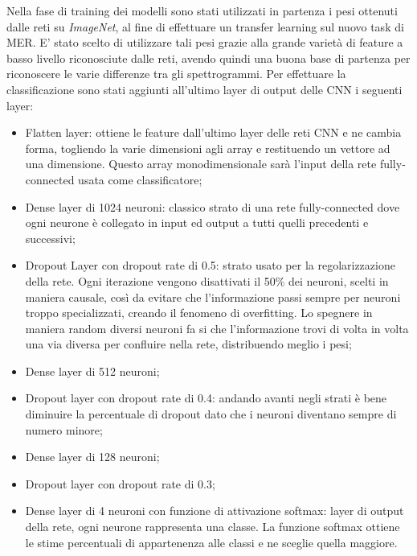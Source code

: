 \documentclass[11pt]{report}
\begin{document}
Nella fase di training dei modelli sono stati utilizzati in partenza i pesi ottenuti dalle reti su \textit{ImageNet}, al fine di effettuare un transfer learning sul nuovo task di MER. E' stato scelto di utilizzare tali pesi grazie alla grande varietà di feature a basso livello riconosciute dalle reti, avendo quindi una buona base di partenza per riconoscere le varie differenze tra gli spettrogrammi. Per effettuare la classificazione sono stati aggiunti all'ultimo layer di output delle CNN i seguenti layer:
\begin{itemize}
    \item Flatten layer: ottiene le feature dall'ultimo layer delle reti CNN e ne cambia forma, togliendo la varie dimensioni agli array e restituendo un vettore ad una dimensione. Questo array monodimensionale sarà l'input della rete fully-connected usata come classificatore;
    
    \item Dense layer di 1024 neuroni: classico strato di una rete fully-connected dove ogni neurone è collegato in input ed output a tutti quelli precedenti e successivi;
    
    \item Dropout Layer con dropout rate di 0.5: strato usato per la regolarizzazione della rete. Ogni iterazione vengono disattivati il 50\% dei neuroni, scelti in maniera causale, così da evitare che l'informazione passi sempre per neuroni troppo specializzati, creando il fenomeno di overfitting. Lo spegnere in maniera random diversi neuroni fa si che l'informazione trovi di volta in volta una via diversa per confluire nella rete, distribuendo meglio i pesi;

    \item Dense layer di 512 neuroni;
    
    \item Dropout layer con dropout rate di 0.4: andando avanti negli strati è bene diminuire la percentuale di dropout dato che i neuroni diventano sempre di numero minore;
    
    \item Dense layer di 128 neuroni;
    
    \item Dropout layer con dropout rate di 0.3;
    
    \item Dense layer di 4 neuroni con funzione di attivazione softmax: layer di output della rete, ogni neurone rappresenta una classe. La funzione softmax ottiene le stime percentuali di appartenenza alle classi e ne sceglie quella maggiore.
\end{itemize}
\end{document}
